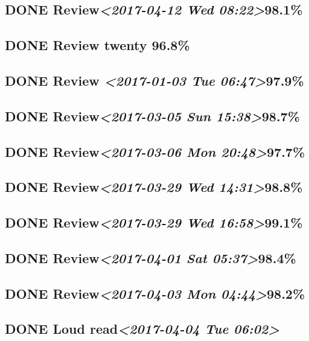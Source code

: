 \documentclass[11pt]{ctexart}
\begin{document}
\subsection{{\bfseries\sffamily DONE} Review\textit{<2017-04-12 Wed 08:22>}98.1\%}
\label{sec:org5b9f06f}
\subsection{{\bfseries\sffamily DONE} Review twenty 96.8\%}
\label{sec:orgd47a054}

\subsection{{\bfseries\sffamily DONE} Review \textit{<2017-01-03 Tue 06:47>}97.9\%}
\label{sec:org2506068}
\subsection{{\bfseries\sffamily DONE} Review\textit{<2017-03-05 Sun 15:38>}98.7\%}
\label{sec:org4c5ff05}
\subsection{{\bfseries\sffamily DONE} Review\textit{<2017-03-06 Mon 20:48>}97.7\%}
\label{sec:orgba5df83}

\subsection{{\bfseries\sffamily DONE} Review\textit{<2017-03-29 Wed 14:31>}98.8\%}
\label{sec:org4282860}
\subsection{{\bfseries\sffamily DONE} Review\textit{<2017-03-29 Wed 16:58>}99.1\%}
\label{sec:org663da15}
\subsection{{\bfseries\sffamily DONE} Review\textit{<2017-04-01 Sat 05:37>}98.4\%}
\label{sec:org305586b}
\subsection{{\bfseries\sffamily DONE} Review\textit{<2017-04-03 Mon 04:44>}98.2\%}
\label{sec:org5e06c52}
\subsection{{\bfseries\sffamily DONE} Loud read\textit{<2017-04-04 Tue 06:02>}}
\label{sec:org12c0ac0}
\end{document}
